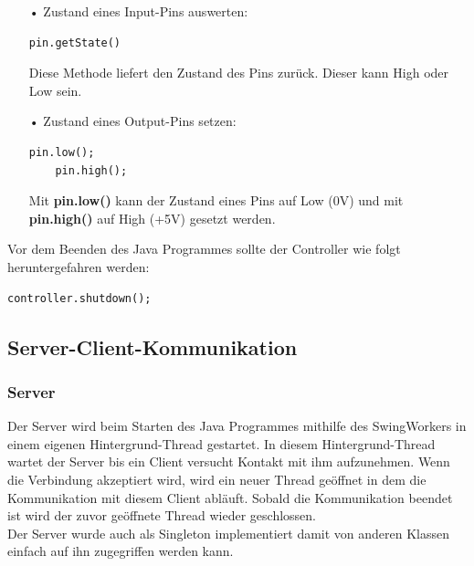 \begin{itemize}
\item[•] Zustand eines Input-Pins auswerten: 
\begin{lstlisting}[style=JavaStyle, caption=Pinzustand abfragen]
	pin.getState()
\end{lstlisting}
Diese Methode liefert den Zustand des Pins zurück. Dieser kann High oder Low sein.
\item[•] Zustand eines Output-Pins setzen:
\begin{lstlisting}[style=JavaStyle, caption=Pinzustand verändern]
	pin.low();	
	pin.high();
\end{lstlisting}
Mit \textbf{pin.low()} kann der Zustand eines Pins auf Low (0V) und mit \textbf{pin.high()} auf High (+5V) gesetzt werden. 
\end{itemize}

Vor dem Beenden des Java Programmes sollte der Controller wie folgt heruntergefahren werden:
\begin{lstlisting}[style=JavaStyle, caption=Controller herunterfahren]
	controller.shutdown();
\end{lstlisting}

\newpage

\subsection{Server-Client-Kommunikation}
\subsubsection{Server}
Der Server wird beim Starten des Java Programmes mithilfe des SwingWorkers in einem eigenen Hintergrund-Thread gestartet. In diesem Hintergrund-Thread wartet der Server bis ein Client versucht Kontakt mit ihm aufzunehmen. Wenn die Verbindung akzeptiert wird, wird ein neuer Thread geöffnet in dem die Kommunikation mit diesem Client abläuft. Sobald die Kommunikation beendet ist wird der zuvor geöffnete Thread wieder geschlossen. 
\\ Der Server wurde auch als Singleton implementiert damit von anderen Klassen einfach auf ihn zugegriffen werden kann.

